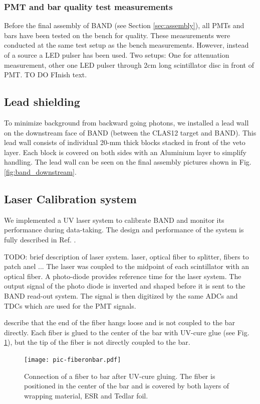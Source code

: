\documentclass[3p,final,twocolumn]{elsarticle}
\begin{document}
\subsubsection{PMT and bar quality test measurements}
Before the final assembly of BAND (see Section \ref{sec:assembly}), all PMTs and bars have been tested on the bench for quality. These measurements were conducted at the same test setup as the bench measurements. However, instead of a source a LED pulser has been used. 
Two setups: One for attenuation measurement, other one LED pulser through 2cm long scintillator disc in front of PMT.
{\color{red} TO DO FInish text.}

\subsection{Lead shielding}
To minimize background from backward going photons, we installed a
lead wall on the downstream face of BAND (between the CLAS12 target
and BAND). This lead wall consists of individual 20-\si{\milli\meter}
thick blocks stacked in front of the veto layer. Each block is covered
on both sides with an Aluminium layer to simplify handling. The
lead wall can be seen on the final assembly pictures shown in
Fig. \ref{fig:band_downstream}.




\subsection{Laser Calibration system}
\label{sec:laserystem}
We implemented a UV laser system to calibrate BAND and monitor its
performance during data-taking. The design and performance of the
system is fully described in Ref. \cite{band-laser}. 

{\color{red} TODO: brief description of laser system.  laser, optical
  fiber to splitter, fibers to patch anel ...}  
The laser was coupled
to the midpoint of each scintillator with an optical fiber.  A
photo-diode provides reference time for the laser system. The output
signal of the photo diode is inverted and shaped before it is sent to
the BAND read-out system. The signal is then digitized by the same ADCs and
TDCs which are used for the PMT signals.

{\color{red} describe that the end of the fiber hangs loose and is not
  coupled to the bar directly.}
Each fiber is glued to the center of the bar with UV-cure glue (see
Fig. \ref{fig:pic-fiberonbar}), but the tip of the fiber is not
directly coupled to the bar.
\begin{figure}[tb]
	\centering
		\texttt{[image: pic-fiberonbar.pdf]}
	\caption{Connection of a fiber to bar after UV-cure gluing. The fiber is positioned in the center of the bar and is covered by both layers of wrapping material, ESR \cite{3MESR} and Tedlar foil.}
	\label{fig:pic-fiberonbar}
\end{figure}
\end{document}
